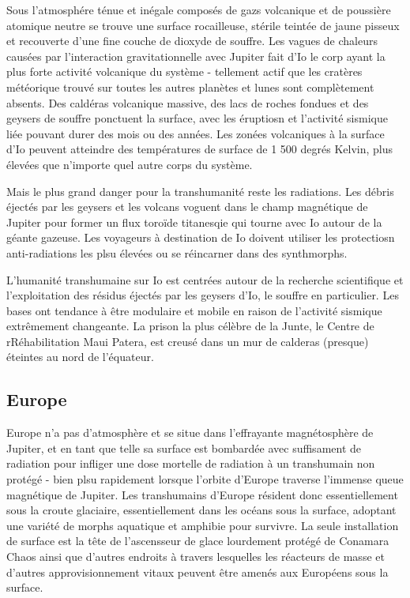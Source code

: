                                                                Sous l'atmosphére ténue et inégale composés de gazs volcanique et de poussière atomique neutre se trouve une surface rocailleuse, stérile teintée de jaune pisseux et recouverte d'une fine couche de dioxyde de souffre. Les vagues de chaleurs causées par l'interaction gravitationnelle avec Jupiter fait d'Io le corp ayant la plus forte activité volcanique du système - tellement actif que les cratères météorique trouvé sur toutes les autres planètes et lunes sont complètement absents. Des caldéras volcanique massive, des lacs de roches fondues et des geysers de souffre ponctuent la surface, avec les éruptiosn et l'activité sismique liée pouvant durer des mois ou des années. Les zonées volcaniques à la surface d'Io peuvent atteindre des températures de surface de 1 500 degrés Kelvin, plus élevées que n'importe quel autre corps du système. 

                                                               Mais le plus grand danger pour la transhumanité reste les radiations. Les débris éjectés par les geysers et les volcans voguent dans le champ magnétique de Jupiter pour former un flux toroïde titanesqie qui tourne avec Io autour de la géante gazeuse. Les voyageurs à destination de Io doivent utiliser les protectiosn anti-radiations les plsu élevées ou se réincarner dans des synthmorphs. 

                                                               L'humanité transhumaine sur Io est centrées autour de la recherche scientifique et l'exploitation des résidus éjectés par les geysers d'Io, le souffre en particulier. Les bases ont tendance à être modulaire et mobile en raison de l'activité sismique extrêmement changeante. La prison la plus célèbre de la Junte, le Centre de rRéhabilitation Maui Patera, est creusé dans un mur de calderas (presque) éteintes au nord de l'équateur. 

                                                               \subsection{Europe} \label{sec:europe} 

                                                               Europe n'a pas d'atmosphère et se situe dans l'effrayante magnétosphère de Jupiter, et en tant que telle sa surface est bombardée avec suffisament de radiation pour infliger une dose mortelle de radiation à un transhumain non protégé - bien plsu rapidement lorsque l'orbite d'Europe traverse l'immense queue magnétique de Jupiter. Les transhumains d'Europe résident donc essentiellement sous la croute glaciaire, essentiellement dans les océans sous la surface, adoptant une variété de morphs aquatique et amphibie pour survivre. La seule installation de surface est la tête de l'ascensseur de glace lourdement protégé de Conamara Chaos ainsi que d'autres endroits à travers lesquelles les réacteurs de masse et d'autres approvisionnement vitaux peuvent être amenés aux Européens sous la surface. 

